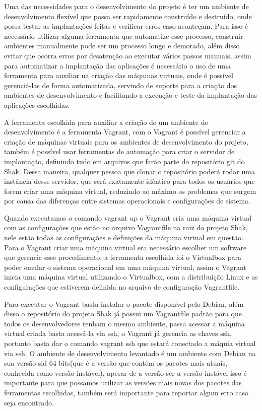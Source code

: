 Uma das necessidades para o desenvolvimento do projeto é ter um ambiente de desenvolvimento
flexível que possa ser rapidamente construído e destruído, onde possa testar as
implantações feitas e verificar erros caso aconteçam. Para isso é necessário utilizar
alguma ferramenta que automatize esse processo, construir ambientes manualmente pode
ser um processo longo e demorado, além disso evitar que ocorra erros por
desatenção ao executar vários passos manuais, assim para automatizar a implantação
das aplicações é necessário o uso de uma ferramenta para auxiliar na criação das
máquinas virtuais, onde é possível gerenciá-las de forma automatizada, servindo de
suporte para a criação dos ambientes de desenvolvimento e facilitando a execução e teste da implantação das
aplicações escolhidas.

A ferramenta escolhida para auxiliar a criação de um ambiente de desenvolvimento é
a ferramenta Vagrant, com o Vagrant é possível gerenciar a criação de máquinas
virtuais para os ambientes de desenvolvimento do projeto, também é possível usar
ferramentas de automação para criar o servidor de implantação, definindo tudo
em arquivos que farão parte do repositório git do Shak. Dessa maneira,
qualquer pessoa que clonar o repositório poderá rodar uma instância desse servidor, que será exatamente
idêntico para todos os usuários que forem criar uma máquina virtual, reduzindo ao
máximo os problemas que surgem por causa das diferenças entre sistemas operacionais e configurações de sistema.

Quando executamos o comando vagrant up o Vagrant cria uma máquina virtual com as
configurações que estão no arquivo Vagrantfile na raiz do projeto Shak, nele
estão todas as configurações e definições da máquina virtual em questão. Para o
Vagrant criar uma máquina virtual era necessário escolher um software que gerencie
esse procedimento, a ferramenta escolhida foi o Virtualbox para poder emular o sistema
operacional em uma máquina virtual, assim o Vagrant inicia uma máquina virtual
utilizando o Virtualbox, com a distribuição Linux e as configurações que estiverem
definida no arquivo de configuração Vagrantfile.

Para executar o Vagrant basta instalar o pacote disponível pelo Debian, além disso
o repositório do projeto Shak já possui um Vagrantfile padrão para que todos os
desenvolvedores tenham o mesmo ambiente, passa acessar a máquina virtual criada
basta acessá-la via ssh, o Vagrant já gerencia as chaves ssh, portanto basta
dar o comando vagrant ssh que estará conectado a máquia virtual via ssh.
O ambiente de desenvolvimento levantado é um ambiente com Debian na sua versão
sid 64 bits(que é a versão que contém os pacotes mais atuais, conhecida como versão instável),
apesar de a versão ser a versão instável isso é importante para que possamos
utilizar as versões mais novas dos pacotes das ferramentas escolhidas, também
será importante para reportar algum erro caso seja encontrado.


